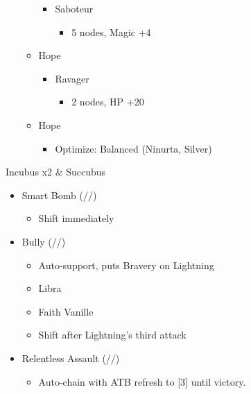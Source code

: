 \begin{multicols}{2}
\begin{menu}
\begin{itemize}
\begin{itemize}
\begin{itemize}
            \item Saboteur
            \begin{itemize}
                \item 5 nodes, Magic +4
            \end{itemize}
        \end{itemize}
        \item Hope
        \begin{itemize}
            \item Ravager
            \begin{itemize}
                \item 2 nodes, HP +20
            \end{itemize}
        \end{itemize}
    \end{itemize}
    \equip
    \begin{itemize}
        \item Hope
        \begin{itemize}
                \item Optimize: Balanced (Ninurta, Silver)
        \end{itemize}
    \end{itemize}
\end{itemize}
\end{menu}

\renewcommand{\first}{[1] Relentless Assault (\rav/\com/\rav)}
\renewcommand{\second}{[2] Bully (\syn/\com/\sab)}
\renewcommand{\third}{[3] Relentless Assault (\rav/\com/\rav)}
\renewcommand{\fourth}{[4] Smart Bomb (\rav/\rav/\sab)}
\renewcommand{\fifth}{[5] Tri-Disaster (\rav/\rav/\rav)}
\renewcommand{\sixth}{[6] Malevolence (\syn/\rav/\rav)}

\begin{battle}{Incubus x2 \& Succubus}
\begin{itemize}
    \item \fourth
    \begin{itemize}
        \item Shift immediately
    \end{itemize}
    \item \second
    \begin{itemize}
        \item Auto-support, puts Bravery on Lightning
        \item Libra
        \item Faith Vanille
        \item Shift after Lightning's third attack
    \end{itemize}
    \item \first
    \begin{itemize}
        \item Auto-chain with ATB refresh to [3] until victory.
    \end{itemize}
\end{itemize}
 
\end{battle}
\end{multicols}
